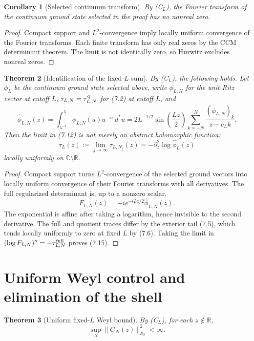 \documentclass[11pt]{amsart}
\newtheorem{theorem}{Theorem}[section]
\newtheorem{corollary}[theorem]{Corollary}
\theoremstyle{definition}
\theoremstyle{remark}
\newcommand{\C}{\mathbb C}
\newcommand{\R}{\mathbb R}
\newcommand{\Schatten}{\mathcal S}
\begin{document}
\begin{corollary}[Selected continuum transform]
By \textup{(C\(_L\))}, the Fourier transform of the continuum
ground state selected in the proof has no nonreal zero.
\end{corollary}

\begin{proof}
Compact support and \(L^2\)-convergence imply locally uniform convergence of
the Fourier transforms.  Each finite transform has only real zeros by the
CCM determinant theorem.  The limit is not identically zero, so Hurwitz
excludes nonreal zeros.
\end{proof}

\begin{theorem}[Identification of the fixed-\(L\) sum]
By \textup{(C\(_L\))}, the following holds.  Let \(\phi_L\) be the continuum
ground state selected above, write \(\phi_{L,N}\) for the unit Ritz vector
at cutoff \(L\), \(\tau_{L,N}=\tau^{\rm q}_{L,N}\) for (7.2) at cutoff
\(L\), and
\[
 \widehat\phi_{L,N}(z)
 =\int_{\lambda^{-1}}^{\lambda}\phi_{L,N}(u)u^{-iz}\,d^*u
 =2L^{-1/2}\sin\left(\frac{Lz}{2}\right)
   \sum_{k=-N}^{N}\frac{(\phi_{L,N})_k}{z-c_Lk}.
\tag{7.14}
\]
Then the limit in (7.12) is not merely an abstract holomorphic function:
\[
\boxed{
 \tau_L(z):=\lim_{j\to\infty}\tau_{L,N_j}(z)
 =-\partial_z^2\log\widehat\phi_L(z)}
\tag{7.15}
\]
locally uniformly on \(\C\setminus\R\).
\end{theorem}

\begin{proof}
Compact support turns \(L^2\)-convergence of the selected ground vectors
into locally uniform convergence of their Fourier transforms with all
derivatives.  The full regularized determinant is, up to a nonzero scalar,
\[
 F_{L,N}(z)=-ie^{-iLz/2}\widehat\phi_{L,N}(z).
\]
The exponential is affine after taking a logarithm, hence invisible to the
second derivative.  The full and quotient traces differ by the exterior
tail (7.5), which tends locally uniformly to zero at fixed \(L\) by (7.6).
Taking the limit in
\((\log F_{L,N})''=-\tau^{\rm full}_{L,N}\) proves (7.15).
\end{proof}

\section{Uniform Weyl control and elimination of the shell}
\label{sec:shell}

\begin{theorem}[Uniform fixed-\(L\) Weyl bound]
By \textup{(C\(_L\))}, for each \(z\notin\R\),
\[
\boxed{\sup_N\|G_N(z)\|_{\Schatten_2}^2<\infty.}
\tag{8.1}
\]
\end{theorem}
\end{document}
